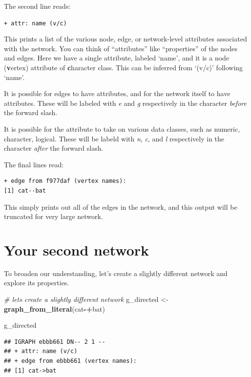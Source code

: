 \documentclass[
]{book}
\newenvironment{Shaded}{\begin{snugshade}}{\end{snugshade}}
\newcommand{\CommentTok}[1]{\textcolor[rgb]{0.56,0.35,0.01}{\textit{#1}}}
\newcommand{\FunctionTok}[1]{\textcolor[rgb]{0.13,0.29,0.53}{\textbf{#1}}}
\newcommand{\NormalTok}[1]{#1}
\newcommand{\OtherTok}[1]{\textcolor[rgb]{0.56,0.35,0.01}{#1}}
\newcommand{\SpecialCharTok}[1]{\textcolor[rgb]{0.81,0.36,0.00}{\textbf{#1}}}
\newcommand{\StringTok}[1]{\textcolor[rgb]{0.31,0.60,0.02}{#1}}
\begin{document}
The second line reads:

\texttt{+\ attr:\ name\ (v/c)}

This prints a list of the various node, edge, or network-level attributes associated with the network. You can think of ``attributes'' like ``properties'' of the nodes and edges. Here we have a single attribute, labeled `name', and it is a node (\textbf{v}ertex) attribute of \textbf{c}haracter class. This can be inferred from `(v/c)' following `name'.

It is possible for edges to have attributes, and for the network itself to have attributes. These will be labeled with \emph{e} and \emph{g} respectively in the character \emph{before} the forward slash.

It is possible for the attribute to take on various data classes, such as numeric, character, logical. These will be labeld with \emph{n}, \emph{c}, and \emph{l} respectively in the character \emph{after} the forward slash.

The final lines read:

\begin{verbatim}
+ edge from f977daf (vertex names):
[1] cat--bat
\end{verbatim}

This simply prints out all of the edges in the network, and this output will be truncated for very large network.

\section{Your second network}\label{your-second-network}

To broaden our understanding, let's create a slightly different network and explore its properties.

\begin{Shaded}
\begin{Highlighting}[]
\CommentTok{\# let\textquotesingle{}s create a slightly different network}
\NormalTok{g\_directed }\OtherTok{\textless{}{-}} \FunctionTok{graph\_from\_literal}\NormalTok{(}\StringTok{\textquotesingle{}cat\textquotesingle{}}\SpecialCharTok{{-}+}\StringTok{\textquotesingle{}bat\textquotesingle{}}\NormalTok{)}

\NormalTok{g\_directed}
\end{Highlighting}
\end{Shaded}

\begin{verbatim}
## IGRAPH ebbb661 DN-- 2 1 -- 
## + attr: name (v/c)
## + edge from ebbb661 (vertex names):
## [1] cat->bat
\end{verbatim}
\end{document}
